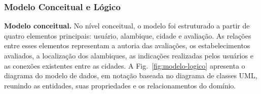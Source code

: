 \documentclass{jaes}
\newcommand{\tstr}{\textcolor{tString}{String}}
\newcommand{\tint}{\textcolor{tInt}{Integer}}
\newcommand{\tflt}{\textcolor{tFloat}{Float}}
\newcommand{\tuid}{\textcolor{tUUID}{UUID}}
\begin{document}
\subsubsection{Modelo Conceitual e Lógico}

\textbf{Modelo conceitual.}
No nível conceitual, o modelo foi estruturado a partir de quatro elementos principais: usuário, alambique, cidade e avaliação. As relações entre esses elementos representam a autoria das avaliações, os estabelecimentos avaliados, a localização dos alambiques, as indicações realizadas pelos usuários e as conexões existentes entre as cidades. A Fig.~\ref{fig:modelo-logico} apresenta o diagrama do modelo de dados, em notação baseada no diagrama de classes UML, reunindo as entidades, suas propriedades e os relacionamentos do domínio.

\begin{figure}[t]
\centering
{}
\end{figure}
\end{document}
